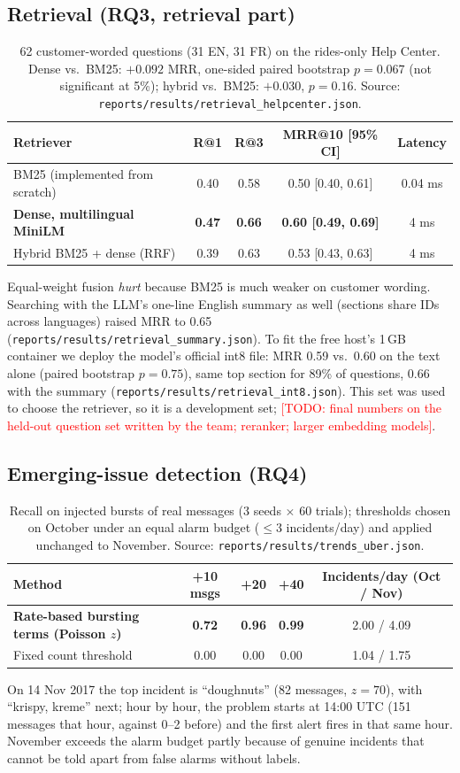 \documentclass[11pt,a4paper]{article}
\newcommand{\todo}[1]{\textcolor{red}{[TODO: #1]}}
\newcommand{\res}[1]{\texttt{\small reports/results/#1}}
\begin{document}
\subsection{Retrieval (RQ3, retrieval part)}
\begin{table}[h]
\centering\small
\begin{tabular}{lcccc}
\toprule
Retriever & R@1 & R@3 & MRR@10 [95\% CI] & Latency \\
\midrule
BM25 (implemented from scratch) & 0.40 & 0.58 & 0.50 [0.40, 0.61] & 0.04 ms \\
\textbf{Dense, multilingual MiniLM} & \textbf{0.47} & \textbf{0.66} & \textbf{0.60 [0.49, 0.69]} & 4 ms \\
Hybrid BM25 + dense (RRF) & 0.39 & 0.63 & 0.53 [0.43, 0.63] & 4 ms \\
\bottomrule
\end{tabular}
\caption{62 customer-worded questions (31 EN, 31 FR) on the rides-only Help Center. Dense vs.\
BM25: $+0.092$ MRR, one-sided paired bootstrap $p=0.067$ (not significant at 5\%); hybrid vs.\
BM25: $+0.030$, $p=0.16$. Source: \res{retrieval\_helpcenter.json}.}
\end{table}
Equal-weight fusion \emph{hurt} because BM25 is much weaker on customer wording. Searching with the
LLM's one-line English summary as well (sections share IDs across languages) raised MRR to 0.65
(\res{retrieval\_summary.json}). To fit the free host's 1\,GB container we deploy the model's
official int8 file: MRR 0.59 vs.\ 0.60 on the text alone (paired bootstrap $p=0.75$), same top
section for 89\% of questions, 0.66 with the summary (\res{retrieval\_int8.json}). This set was
used to choose the retriever, so it is a development set; \todo{final numbers on the held-out
question set written by the team; reranker; larger embedding models}.

\subsection{Emerging-issue detection (RQ4)}
\begin{table}[h]
\centering\small
\begin{tabular}{lcccc}
\toprule
Method & +10 msgs & +20 & +40 & Incidents/day (Oct / Nov) \\
\midrule
\textbf{Rate-based bursting terms (Poisson $z$)} & \textbf{0.72} & \textbf{0.96} & \textbf{0.99} & 2.00 / 4.09 \\
Fixed count threshold & 0.00 & 0.00 & 0.00 & 1.04 / 1.75 \\
\bottomrule
\end{tabular}
\caption{Recall on injected bursts of real messages (3 seeds $\times$ 60 trials); thresholds chosen on
October under an equal alarm budget ($\leq 3$ incidents/day) and applied unchanged to November.
Source: \res{trends\_uber.json}.}
\end{table}
On 14 Nov 2017 the top incident is ``doughnuts'' (82 messages, $z=70$), with ``krispy, kreme'' next;
hour by hour, the problem starts at 14:00 UTC (151 messages that hour, against 0--2 before) and the
first alert fires in that same hour. November
exceeds the alarm budget partly because of genuine incidents that cannot be told apart from false
alarms without labels.
\end{document}
